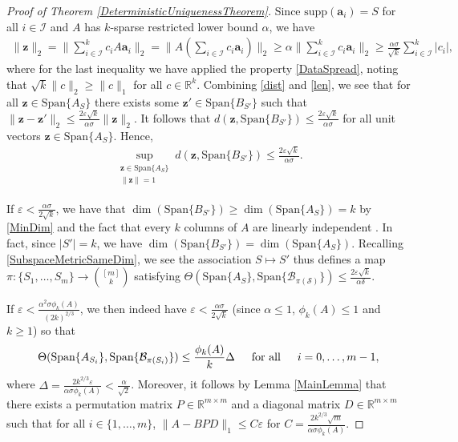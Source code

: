 \documentclass[journal, onecolumn]{IEEEtran}
\begin{document}
\begin{proof}[Proof of Theorem \ref{DeterministicUniquenessTheorem}]
Since $\text{supp}(\mathbf{a}_i) = S$ for all $i \in \mathcal{I}$ and $A$ has $k$-sparse restricted lower bound $\alpha$, we have 
\begin{align}\label{len}
\|\mathbf{z}\|_2 = \|\sum_{i \in \mathcal{I}}^k c_i A \mathbf{a}_i\|_2 
= \|A (\sum_{i \in \mathcal{I}} c_i \mathbf{a}_i) \|_2 
\geq \alpha \|\sum_{i \in \mathcal{I}}^k c_i \mathbf{a}_i\|_2 
\geq \frac{\alpha\sigma}{\sqrt{k}}\sum_{i \in \mathcal{I}}^k |c_i|,
\end{align}
%
where for the last inequality we have applied the property \eqref{DataSpread}, noting that $\sqrt{k}\|c\|_2 \geq \|c\|_1$ for all $c \in \mathbb{R}^k$. Combining \eqref{dist} and \eqref{len}, we see that for all $\mathbf{z} \in \text{Span}\{A_S\}$ there exists some $\mathbf{z}' \in \text{Span}\{B_{S'}\}$ such that $\|\mathbf{z} - \mathbf{z}'\|_2 \leq \frac{ 2 \varepsilon \sqrt{k}}{ \alpha \sigma } \|\mathbf{z}\|_2$. It follows that $d(\mathbf{z}, \text{Span}\{B_{S'}\}) \leq \frac{ 2 \varepsilon \sqrt{k} }{ \alpha \sigma }$ for all unit vectors $\mathbf{z} \in \text{Span}\{A_S\}$. Hence,
\begin{align}\label{ABSubspaceDistance}
\sup_{ \substack{ \mathbf{z} \in \text{Span}\{A_{S}\} \\ \|\mathbf{z}\| = 1} } d(\mathbf{z}, \text{Span}\{B_{S'}\}) \leq \frac{ 2 \varepsilon \sqrt{k} }{ \alpha \sigma }.
\end{align}

If $\varepsilon < \frac{\alpha\sigma}{2\sqrt{k}}$, we have that $\dim(\text{Span}\{B_{S'}\}) \geq \dim(\text{Span}\{A_S\}) = k$ by \eqref{MinDim} and the fact that every $k$ columns of $A$ are linearly independent . In fact, since $|S'| = k$, we have $\dim(\text{Span}\{B_{S'}\}) = \dim(\text{Span}\{A_S\})$. Recalling \eqref{SubspaceMetricSameDim},  we see the association $S \mapsto S'$ thus defines a map $\pi: \{S_1, \ldots, S_m\} \to {[m] \choose k}$ satisfying $\Theta(\text{Span}\{A_S\}, \text{Span}\{\mathcal{B_{\pi(S)}}\}) \leq \frac{ 2 \varepsilon \sqrt{k} }{ \alpha \delta }$.

If $\varepsilon < \frac{\alpha^2\sigma\phi_k(A)}{(2k)^{2/3}}$, we then indeed have $\varepsilon < \frac{\alpha\sigma}{2\sqrt{k}}$ (since $\alpha \leq 1$, $\phi_k(A) \leq 1$ and $k \geq 1$) so that 
\begin{align}\label{SubspaceDistanceUpperBound}
\Theta(\text{Span}\{A_{S_i}\}, \text{Span}\{\mathcal{B}_{\pi(S_i)}\}) \leq \frac{\phi_k(A)}{k}\Delta
\indent \text{for all} \indent i = 0, \ldots, m-1,
\end{align}
%
where $\Delta = \frac{2k^{2/3}\varepsilon}{\alpha\sigma\phi_k(A)} < \frac{\alpha}{\sqrt{2}}$. Moreover, it follows by Lemma \ref{MainLemma} that there exists a permutation matrix $P \in \mathbb{R}^{m \times m}$ and a diagonal matrix $D \in \mathbb{R}^{m \times m}$ such that for all $i \in \{1, \ldots, m\}$,
$\|A - BPD\|_1 \leq C\varepsilon$ for $C = \frac{2k^{2/3}\sqrt{m}}{\alpha\sigma\phi_k(A)}$.
\end{proof}
\end{document}
